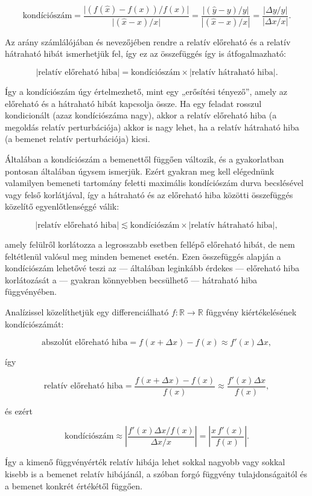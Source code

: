 \documentclass[
  magyar,
  11pt]{article}
\begin{document}
\[\text{kondíciószám} = \frac{\bigl|(f(\hat{x}) - f(x))/f(x)\bigr|}{\bigl|(\hat{x} - x)/x\bigr|} = \frac{|(\hat{y} - y)/y|}{|(\hat{x} - x)/x|} = \frac{|\Delta y/y|}{|\Delta x/x|}.\]

Az arány számlálójában és nevezőjében rendre a relatív előreható és a
relatív hátraható hibát ismerhetjük fel, így ez az összefüggés így is
átfogalmazható:

\[|\text{relatív előreható hiba}| = \text{kondíciószám} \times |\text{relatív hátraható hiba}|.\]

Így a kondíciószám úgy értelmezhető, mint egy „erősítési tényező'',
amely az előreható és a hátraható hibát kapcsolja össze. Ha egy feladat
rosszul kondicionált (azaz kondíciószáma nagy), akkor a relatív
előreható hiba (a megoldás relatív perturbációja) akkor is nagy lehet,
ha a relatív hátraható hiba (a bemenet relatív perturbációja) kicsi.

Általában a kondíciószám a bemenettől függően változik, és a
gyakorlatban pontosan általában úgysem ismerjük. Ezért gyakran meg kell
elégednünk valamilyen bemeneti tartomány feletti maximális kondíciószám
durva becslésével vagy felső korlátjával, így a hátraható és az
előreható hiba közötti összefüggés közelítő egyenlőtlenséggé válik:

\[|\text{relatív előreható hiba}| \lesssim \text{kondíciószám} \times |\text{relatív hátraható hiba}|,\]

amely felülről korlátozza a legrosszabb esetben fellépő előreható hibát,
de nem feltétlenül valósul meg minden bemenet esetén. Ezen összefüggés
alapján a kondíciószám lehetővé teszi az --- általában leginkább érdekes
--- előreható hiba korlátozását a --- gyakran könnyebben becsülhető ---
hátraható hiba függvényében.

Analízissel közelíthetjük egy differenciálható
\(f: \mathbb{R} \to \mathbb{R}\) függvény kiértékelésének
kondíciószámát:

\[\text{abszolút előreható hiba} = f(x + \Delta x) - f(x) \approx f'(x)\Delta x,\]

így

\[\text{relatív előreható hiba} = \frac{f(x + \Delta x) - f(x)}{f(x)} \approx \frac{f'(x)\Delta x}{f(x)},\]

és ezért

\[\text{kondíciószám} \approx \left| \frac{f'(x)\Delta x/f(x)}{\Delta x/x} \right| = \left| \frac{x\,f'(x)}{f(x)} \right|.\]

Így a kimenő függvényérték relatív hibája lehet sokkal nagyobb vagy
sokkal kisebb is a bemenet relatív hibájánál, a szóban forgó függvény
tulajdonságaitól és a bemenet konkrét értékétől függően.
\end{document}
